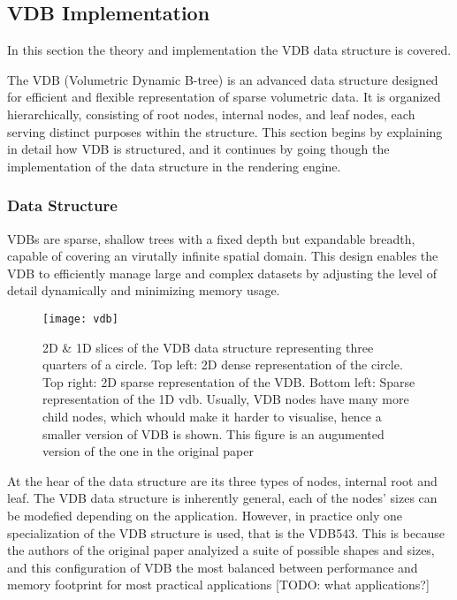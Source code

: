 \subsection{VDB Implementation}

In this section the theory and implementation the VDB data structure is covered.

The VDB (Volumetric Dynamic B-tree) is an advanced data structure designed for efficient and flexible representation of sparse volumetric data. It is organized hierarchically, consisting of root nodes, internal nodes, and leaf nodes, each serving distinct purposes within the structure. This section begins by explaining in detail how VDB is structured, and it continues by going though the implementation of the data structure in the rendering engine.

\subsubsection{Data Structure}
\label{vdb:ds}

VDBs are sparse, shallow trees with a fixed depth but expandable breadth, capable of covering an virutally infinite spatial domain. This design enables the VDB to efficiently manage large and complex datasets by adjusting the level of detail dynamically and minimizing memory usage.

\begin{figure}[H]
  \centering
  \texttt{[image: vdb]}
  \caption{2D \& 1D slices of the VDB data structure representing three quarters of a circle. Top left: 2D dense representation of the circle. Top right: 2D sparse representation of the VDB. Bottom left: Sparse representation of the 1D vdb. Usually, VDB nodes have many more child nodes, which whould make it harder to visualise, hence a smaller version of VDB is shown. This figure is an augumented version of the one in the original paper\supercite{vdb2013}}
\end{figure}

At the hear of the data structure are its three types of nodes, internal root and leaf. The VDB data structure is inherently general, each of the nodes' sizes can be modefied depending on the application. However, in practice only one specialization of the VDB structure is used, that is the VDB543. This is because the authors of the original paper\supercite{vdb2013} analyized a suite of possible shapes and sizes, and this configuration of VDB the most balanced between performance and memory footprint for most practical applications [TODO: what applications?]

